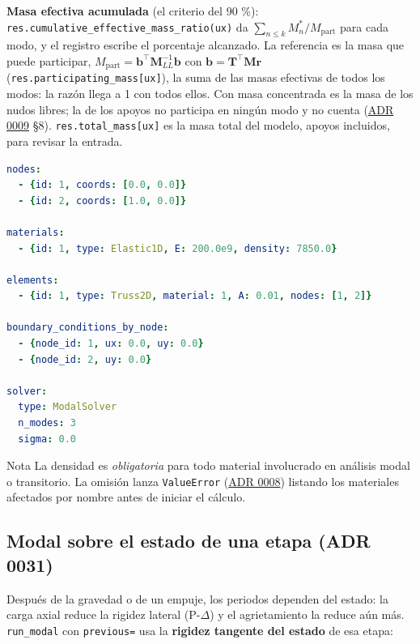 \documentclass[11pt,oneside]{report}
\begin{document}
\textbf{Masa efectiva acumulada} (el criterio del 90 \%): \texttt{res.\allowbreak{}cumulative\_\allowbreak{}effective\_\allowbreak{}mass\_\allowbreak{}ratio(\textquotedbl{}ux\textquotedbl{})} da $\sum_{n\le k} M_n^*/M_\text{part}$ para cada modo, y el registro escribe el porcentaje alcanzado. La referencia es la masa que puede participar, $M_\text{part} = \mathbf b^\top\mathbf M_{LL}^{-1}\mathbf b$ con $\mathbf b = \mathbf T^\top\mathbf M\mathbf r$ (\texttt{res.\allowbreak{}participating\_\allowbreak{}mass[\textquotedbl{}ux\textquotedbl{}]}), la suma de las masas efectivas de todos los modos: la razón llega a 1 con todos ellos. Con masa concentrada es la masa de los nudos libres; la de los apoyos no participa en ningún modo y no cuenta (\href{https://github.com/jretamav/solidum-fem/blob/main/docs/adr/0009-analisis-modal-y-dinamico.md}{ADR 0009} §8). \texttt{res.\allowbreak{}total\_\allowbreak{}mass[\textquotedbl{}ux\textquotedbl{}]} es la masa total del modelo, apoyos incluidos, para revisar la entrada.

\begin{lstlisting}[language=yaml]
nodes:
  - {id: 1, coords: [0.0, 0.0]}
  - {id: 2, coords: [1.0, 0.0]}

materials:
  - {id: 1, type: Elastic1D, E: 200.0e9, density: 7850.0}

elements:
  - {id: 1, type: Truss2D, material: 1, A: 0.01, nodes: [1, 2]}

boundary_conditions_by_node:
  - {node_id: 1, ux: 0.0, uy: 0.0}
  - {node_id: 2, uy: 0.0}

solver:
  type: ModalSolver
  n_modes: 3
  sigma: 0.0

\end{lstlisting}

\begin{infobox}{Nota}
La densidad es \textit{obligatoria} para todo material involucrado en análisis modal o transitorio. La omisión lanza \texttt{ValueError} (\href{https://github.com/jretamav/solidum-fem/blob/main/docs/adr/0008-densidad-propiedad-del-material.md}{ADR 0008}) listando los materiales afectados por nombre antes de iniciar el cálculo.
\end{infobox}

\subsection{Modal sobre el estado de una etapa (ADR 0031)}

Después de la gravedad o de un empuje, los periodos dependen del estado: la carga axial reduce la rigidez lateral (P-\ensuremath{\Delta}) y el agrietamiento la reduce aún más. \texttt{run\_modal} con \texttt{previous=} usa la \textbf{rigidez tangente del estado} de esa etapa:
\end{document}
